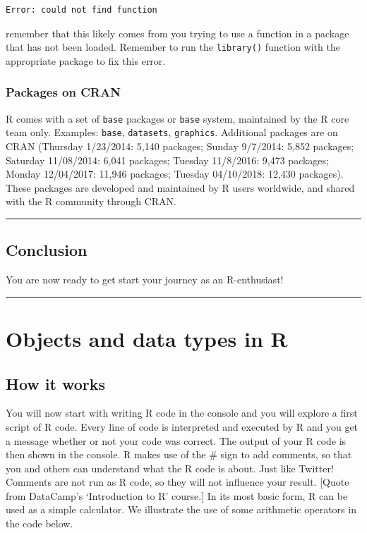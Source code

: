 \documentclass[
]{book}
\begin{document}
\begin{verbatim}
Error: could not find function
\end{verbatim}

remember that this likely comes from you trying to use a function in a package that has not been loaded. Remember to run the \texttt{library()} function with the appropriate package to fix this error.

\hypertarget{packages-on-cran}{%
\subsection{Packages on CRAN}\label{packages-on-cran}}

R comes with a set of \texttt{base} packages or \texttt{base} system, maintained by the R core
team only. Examples: \texttt{base}, \texttt{datasets}, \texttt{graphics}. Additional packages are on CRAN (Thursday 1/23/2014: 5,140
packages; Sunday 9/7/2014: 5,852 packages; Saturday 11/08/2014:
6,041 packages; Tuesday 11/8/2016: 9,473 packages; Monday
12/04/2017: 11,946 packages; Tuesday 04/10/2018: 12,430
packages). These packages are developed and maintained by R users worldwide,
and shared with the R community through CRAN.

\begin{center}\rule{0.5\linewidth}{0.5pt}\end{center}

\hypertarget{conclusion}{%
\section{Conclusion}\label{conclusion}}

You are now ready to get start your journey as an R-enthusiast!

\begin{center}\rule{0.5\linewidth}{0.5pt}\end{center}

\hypertarget{objects-data-types}{%
\chapter{Objects and data types in R}\label{objects-data-types}}

\hypertarget{how-it-works}{%
\section{How it works}\label{how-it-works}}

You will now start with writing R code in the console and you will explore a first script of R code. Every line of code is interpreted and executed by R and you get a message whether or not your code was correct. The output of your R code is then shown in the console.
R makes use of the \# sign to add comments, so that you and others can understand what the R code is about. Just like Twitter! Comments are not run as R code, so they will not influence your result. {[}Quote from DataCamp's `Introduction to R' course.{]} In its most basic form, R can be used as a simple calculator. We illustrate the use of some arithmetic operators in the code below.
\end{document}
